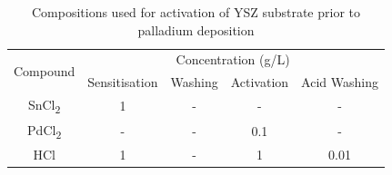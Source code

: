 \begin{table}[]
  \centering
  \caption{Compositions used for activation of YSZ substrate prior to palladium deposition}
  \label{pretreat}
  \begin{tabular}{@{}ccccc@{}}
  \toprule
  \multicolumn{1}{l}{\multirow{2}{*}{Compound}} & \multicolumn{4}{c}{Concentration (g/L)}             \\ \cmidrule(l){2-5} 
  \multicolumn{1}{l}{}                          & Sensitisation & Washing & Activation & Acid Washing \\ \midrule
  SnCl\textsubscript{2}                                         & 1             & -       & -          & -            \\
  PdCl\textsubscript{2}                                         & -             & -       & 0.1        & -            \\
  HCl                                           & 1             & -       & 1          & 0.01           \\ \bottomrule
  \end{tabular}
  \end{table}

